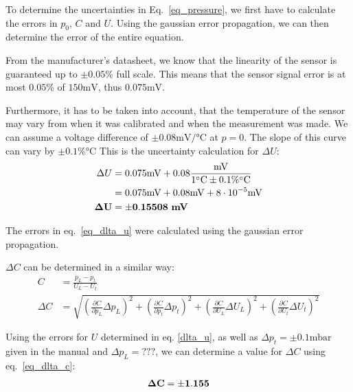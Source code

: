     To determine the uncertainties in Eq.~\ref{eq_pressure}, we first have to calculate the errors in $p_0$, $C$ and $U$.
    Using the gaussian error propagation, we can then determine the error of the entire equation.


    From the manufacturer's datasheet, we know that the linearity of the sensor is guaranteed up to $\pm 0.05\%$ full scale. %
    This means that the sensor signal error is at most $0.05\%$ of $150\si{\milli\volt}$, thus $0.075\si{\milli\volt}$.

    Furthermore, it has to be taken into account, that the temperature of the sensor may vary from when
    it was calibrated and when the measurement was made. We can assume a voltage difference of $\pm 0.08\si{\milli\volt}/\si{\celsius}$ at $p = 0$.
    The slope of this curve can vary by $\pm 0.1\% \si{\celsius}$
    This is the uncertainty calculation for $\Delta U$:
    \begin{align}
        \Delta U &= 0.075 \si{\milli\volt} + 0.08 \frac{\si{\milli\volt}}{1 \si{\celsius} \pm 0.1 \% \si{\celsius}}\\
        &= 0.075 \si{\milli\volt} + 0.08 \si{\milli\volt} + 8 \cdot 10^{-5} \si{\milli\volt} \label{eq_dlta_u}\\
        \bf \Delta U &= \bf \pm 0.15508 ~\si{\bf\milli\volt} \label{dlta_u}
    \end{align}

    The errors in eq.~\ref{eq_dlta_u} were calculated using the gaussian error propagation.

    $\Delta C$ can be determined in a similar way:
    \begin{align}
        C &= \frac{p_L - p_t}{U_L - U_t}\\
        \Delta C &= \sqrt{ \left(\frac{\partial C}{\partial p_L} \Delta p_L \right)^2 +
                        \left(\frac{\partial C}{\partial p_t} \Delta p_t \right)^2 +
                        \left(\frac{\partial C}{\partial U_L} \Delta U_L \right)^2 +
                        \left(\frac{\partial C}{\partial U_t} \Delta U_t \right)^2 } \label{eq_dlta_c}
    \end{align}

    Using the errors for $U$ determined in eq. \ref{dlta_u}, as well as $\Delta p_t = \pm 0.1 \si{\milli\bar}$ given in the manual and $\Delta p_L = \textbf{???}$,
    we can determine a value for $\Delta C$ using eq.~\ref{eq_dlta_c}:
    \begin{align}
        \bf \Delta C = \pm 1.155 \label{dlta_c}
    \end{align}

